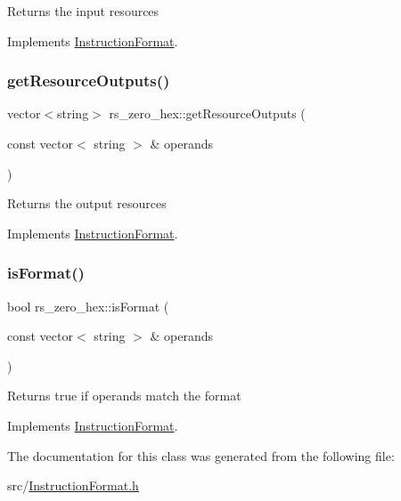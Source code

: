Returns the input resources 

Implements \hyperlink{classInstructionFormat_a09775d3a3c22f40a0f44504664e586e4}{Instruction\+Format}.

\mbox{\label{classrs__zero__hex_ade4a0e0f8aa6fe706a2bc6059c56013e}} 
\subsubsection{\texorpdfstring{get\+Resource\+Outputs()}{getResourceOutputs()}}
{\footnotesize\ttfamily vector$<$string$>$ rs\+\_\+zero\+\_\+hex\+::get\+Resource\+Outputs (\begin{DoxyParamCaption}\item[{const vector$<$ string $>$ \&}]{operands }\end{DoxyParamCaption})\hspace{0.3cm}{\ttfamily [virtual]}}

Returns the output resources 

Implements \hyperlink{classInstructionFormat_a95cd28ffb1bde59b67f676880ab10536}{Instruction\+Format}.

\mbox{\label{classrs__zero__hex_ab1086f903e313eff8021b5edd83af9eb}} 
\subsubsection{\texorpdfstring{is\+Format()}{isFormat()}}
{\footnotesize\ttfamily bool rs\+\_\+zero\+\_\+hex\+::is\+Format (\begin{DoxyParamCaption}\item[{const vector$<$ string $>$ \&}]{operands }\end{DoxyParamCaption})\hspace{0.3cm}{\ttfamily [virtual]}}

Returns true if operands match the format 

Implements \hyperlink{classInstructionFormat_a9fdcf94dcd7d9a55ba86e7a63f04d1fe}{Instruction\+Format}.



The documentation for this class was generated from the following file\+:\begin{DoxyCompactItemize}
\item 
src/\hyperlink{InstructionFormat_8h}{Instruction\+Format.\+h}\end{DoxyCompactItemize}
